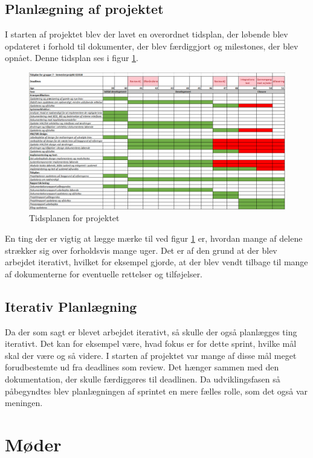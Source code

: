 \documentclass[a4paper,12pt,fleqn,oneside]{article}
\begin{document}
\subsection{Planlægning af projektet}
I starten af projektet blev der lavet en overordnet tidsplan, der løbende blev opdateret i forhold til dokumenter, der blev færdiggjort og milestones, der blev opnået. Denne tidsplan ses i figur \ref{fig:projekt_schedule}.
\begin{figure}[H]
    \centering
    \includegraphics[width=\textwidth]{Processdokument/graphics/Tidsplan.png}
    \caption{Tidsplanen for projektet}
    \label{fig:projekt_schedule}
\end{figure}
En ting der er vigtig at lægge mærke til ved figur \ref{fig:projekt_schedule} er, hvordan mange af delene strækker sig over forholdsvis mange uger. Det er af den grund at der blev arbejdet iterativt, hvilket for eksempel gjorde, at der blev vendt tilbage til mange af dokumenterne for eventuelle rettelser og tilføjelser. 

\subsection{Iterativ Planlægning}
Da der som sagt er blevet arbejdet iterativt, så skulle der også planlægges ting iterativt. Det kan for eksempel være, hvad fokus er for dette sprint, hvilke mål skal der være og så videre. I starten af projektet var mange af disse mål meget forudbestemte ud fra deadlines som review. Det hænger sammen med den dokumentation, der skulle færdiggøres til deadlinen. Da udviklingsfasen så påbegyndtes blev planlægningen af sprintet en mere fælles rolle, som det også var meningen.


\section{Møder} 
\end{document}
